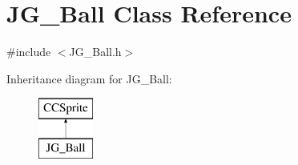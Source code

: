 \hypertarget{class_j_g___ball}{\section{J\-G\-\_\-\-Ball Class Reference}
\label{class_j_g___ball}
}


{\ttfamily \#include $<$J\-G\-\_\-\-Ball.\-h$>$}

Inheritance diagram for J\-G\-\_\-\-Ball\-:\begin{figure}[H]
\begin{center}
\leavevmode
\includegraphics[height=2.000000cm]{class_j_g___ball}
\end{center}
\end{figure}
